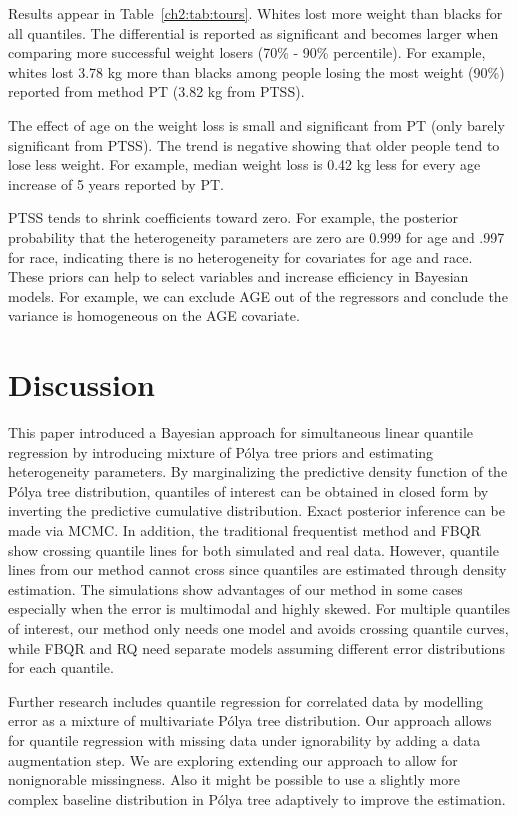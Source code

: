\documentclass[12pt]{article}
\newcommand{\polya}{P\'{o}lya}
\begin{document}
Results appear in Table~\ref{ch2:tab:tours}.
Whites lost more weight than blacks for all quantiles.
The differential is reported as significant and becomes larger when comparing more successful weight losers (70\% - 90\% percentile).
For example, whites lost 3.78 kg more than blacks among people losing the most weight (90\%) reported from method PT (3.82 kg from PTSS).

The effect of age on the weight loss is small and significant from PT (only barely significant from PTSS).
The trend is negative showing that older people tend to lose less weight.
For example, median weight loss is 0.42 kg less for every age increase of 5 years reported by PT.

PTSS tends to shrink coefficients toward zero. For example, the
posterior probability that the heterogeneity parameters are zero are
0.999 for age and .997 for race, indicating there is no
heterogeneity for covariates for age and race. These priors can help to select
variables and increase efficiency in Bayesian models. For example, we
can exclude AGE out of the regressors and conclude the variance is
homogeneous on the AGE covariate.


\section{Discussion}
\label{ch2:sec:discussion}
This paper introduced a Bayesian approach for simultaneous linear quantile regression by introducing mixture of \polya{} tree priors and estimating heterogeneity parameters.
By marginalizing the predictive density function of the \polya{} tree distribution, quantiles of interest can be obtained in closed form by inverting the predictive cumulative distribution.
Exact posterior inference can be made via MCMC.
In addition, the traditional frequentist method and FBQR show crossing quantile lines for both simulated and real data.
However, quantile lines from our method cannot cross since quantiles are estimated through density estimation.
The simulations show advantages of our method in some cases especially when the error is multimodal and highly skewed.
For multiple quantiles of interest, our method only needs one model and avoids crossing quantile curves, while FBQR and RQ need separate models assuming different error distributions for each quantile.

Further research includes quantile regression for correlated data by modelling error as a mixture of multivariate \polya{} tree distribution.
Our approach allows for quantile regression with missing data under ignorability by adding a data augmentation step.
We are exploring extending our approach to allow for nonignorable missingness.
Also it might be possible to use a slightly more complex baseline distribution in \polya{} tree adaptively to improve the estimation.

 
\end{document}
